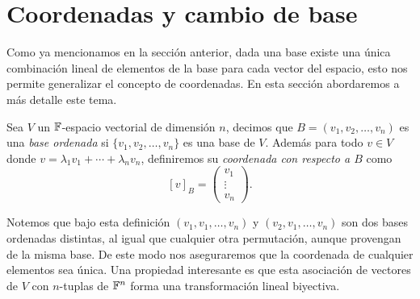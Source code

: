 \section{Coordenadas y cambio de base}

Como ya mencionamos en la sección anterior, dada una base existe una única combinación lineal de elementos de la base para cada vector del espacio, esto nos permite generalizar el concepto de coordenadas. En esta sección abordaremos a más detalle este tema.


\begin{defi}
  Sea $V$ un $\mathbb{F}$-espacio vectorial de dimensión $n$, decimos que $B = (v_1, v_2, \ldots, v_n)$ es una \emph{base ordenada} si $\{v_1, v_2, \ldots, v_n\}$ es una base de $V$. Además para todo $v \in V$ donde $v = \lambda_1 v_1 + \cdots + \lambda_n v_n$, definiremos su \emph{coordenada con respecto a $B$} como
    \[ [v]_B = \begin{pmatrix}
      v_1 \\ \vdots \\ v_n
    \end{pmatrix}.\]
\end{defi}

Notemos que bajo esta definición $(v_1, v_1, \ldots, v_n)$ y $(v_2, v_1, \ldots, v_n)$ son dos bases ordenadas distintas, al igual que cualquier otra permutación, aunque provengan de la misma base. De este modo nos aseguraremos que la coordenada de cualquier elementos sea única. Una propiedad interesante es que esta asociación de vectores de $V$ con $n$-tuplas de $\mathbb{F}^n$ forma una transformación lineal biyectiva.

